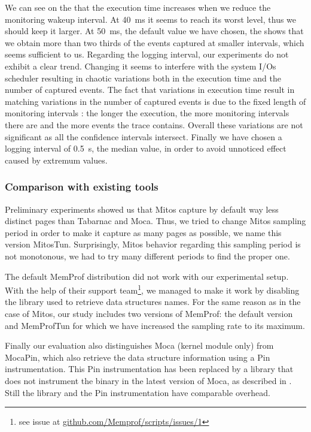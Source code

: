 We can see on the  that the execution time increases when we reduce the monitoring wakeup interval.
At \SI{40}{ms} it seems to reach its worst level, thus we should keep it larger.
At \SI{50}{ms}, the default value we have chosen, the  shows that we obtain more than two thirds of the events captured at smaller intervals, which seems sufficient to us.
Regarding the logging interval, our experiments do not exhibit a clear trend.
Changing it seems to interfere with the system I/Os scheduler resulting in chaotic variations both in the execution time and the number of captured events.
The fact that variations in execution time result in matching variations in the number of captured events is due to the fixed length of monitoring intervals : the longer the execution, the more monitoring intervals there are and the more events the trace contains.
Overall these variations are not significant as all the confidence intervals intersect.
Finally we have chosen a logging interval of \SI{0.5}{s}, the median value, in order to avoid unnoticed effect caused by extremum values.

\subsubsection{Comparison with existing tools}

Preliminary experiments showed us that \gls{Mitos} capture by default way less distinct pages than \gls{Tabarnac} and \gls{Moca}.
Thus, we tried to change \gls{Mitos} sampling period in order to make it capture as many pages as possible, we name this version MitosTun.
Surprisingly, \gls{Mitos} behavior regarding this sampling period is not monotonous, we had to try many different periods to find the proper one.

The default \gls{MemProf} distribution did not work with our experimental setup.
With the help of their support team\footnote{
    see issue at \href{https://github.com/Memprof/scripts/issues/1}{github.com/Memprof/scripts/issues/1}
}, we managed to make it work by disabling the library used to retrieve data structures names.
For the same reason as in the case of \gls{Mitos}, our study includes two versions of \gls{MemProf}: the default version and MemProfTun for which we have increased the sampling rate to its maximum.

Finally our evaluation also distinguishes \gls{Moca} (kernel module only) from MocaPin, which also retrieve the data structure information using a \gls{Pin} instrumentation.
This \gls{Pin} instrumentation has been replaced by a library that does not instrument the binary in the latest version of \gls{Moca}, as described in .
Still the library and the \gls{Pin} instrumentation have comparable overhead.


